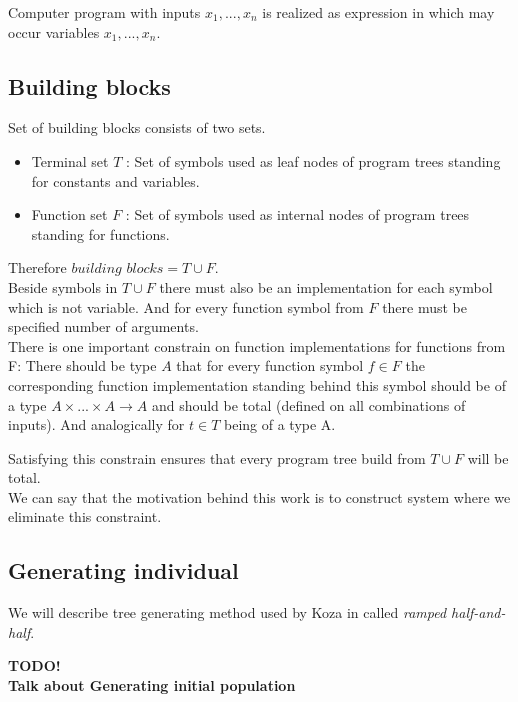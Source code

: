 \documentclass[12pt,a4paper]{report}
\begin{document}
Computer program with inputs $x_{1}, ..., x_{n}$ is realized as expression in which 
may occur variables $x_{1}, ..., x_{n}$.

\subsection{Building blocks}

Set of building blocks consists of two sets.

\begin{itemize}
	\item Terminal set $T$ : Set of symbols used as leaf nodes of 	               
	      program trees standing for constants and variables.
	\item Function set $F$ : Set of symbols used as internal nodes 
	      of program trees standing for functions.
\end{itemize}

Therefore $building$ $blocks = T \cup F$.\\

Beside symbols in $T \cup F$ there must also be 
an implementation for each symbol which is not variable. 
And for every function symbol from $F$ there must be specified 
number of arguments.\\

There is one important constrain on function implementations for functions from F:
There should be type $A$ that for every function symbol $f \in F$ the corresponding function implementation standing behind this symbol should be of a type 
$A \times ... \times A \rightarrow A$ and should be total (defined on all
combinations of inputs). And analogically for $t \in T$ being of a type A.  

Satisfying this constrain ensures that every program tree build 
from $T \cup F$ will be total.\\

We can say that the motivation behind this work is to construct system where we
eliminate this constraint. 

\subsection{Generating individual}

We will describe tree generating method used by Koza in \cite{koza92} called
\textit{ramped half-and-half}. 

\textbf{TODO!}\\
\textbf{Talk about Generating initial population}
\end{document}

